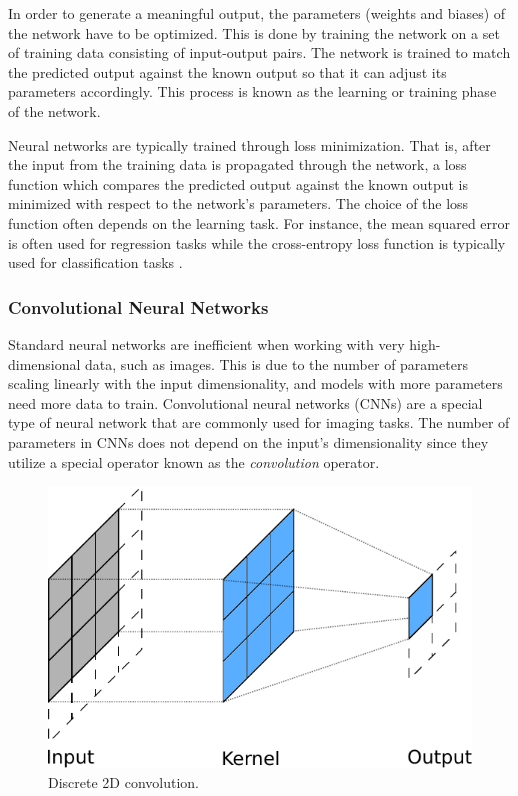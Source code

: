 In order to generate a meaningful output, the parameters (weights and biases) of the network have to be optimized. This is done by training the network on a set of training data consisting of input-output pairs. The network is trained to match the predicted output against the known output so that it can adjust its parameters accordingly. This process is known as the learning or training phase of the network.

Neural networks are typically trained through loss minimization. That is, after the input from the training data is propagated through the network, a loss function which compares the predicted output against the known output is minimized with respect to the network's parameters. The choice of the loss function often depends on the learning task. For instance, the mean squared error is often used for regression tasks while the cross-entropy loss function is typically used for classification tasks \parencite{nielsen2015neural}.

\subsubsection{Convolutional Neural Networks}


Standard neural networks are inefficient when working with very high-dimensional data, such as images. This is due to the number of parameters scaling linearly with the input dimensionality, and models with more parameters need more data to train.
Convolutional neural networks (CNNs) are a special type of neural network that are commonly used for imaging tasks. The number of parameters in CNNs does not depend on the input's dimensionality since they utilize a special operator known as the \emph{convolution} operator.

\begin{figure}[thbp]
    \centering
    \includegraphics[width=.5\textwidth]{figures/conv4.pdf}
    \caption{Discrete 2D convolution.}
    \label{fig:conv}
\end{figure}

